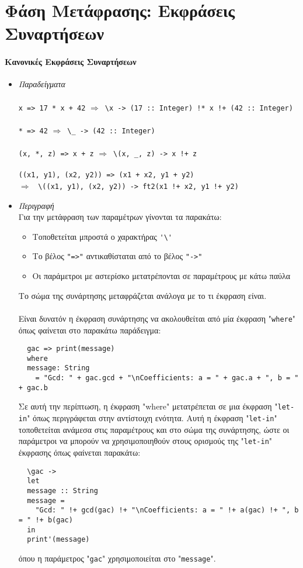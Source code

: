 \documentclass[diploma]{softlab-thesis}
\def\lra{$\Longrightarrow$\ }
\begin{document}
\newpage

\section{Φάση Μετάφρασης: Εκφράσεις Συναρτήσεων}

\paragraph{Κανονικές Εκφράσεις Συναρτήσεων}

\begin{itemize}
\item
\textit{Παραδείγματα}\\\\
\verb|x => 17 * x + 42| \lra \verb|\x -> (17 :: Integer) !* x !+ (42 :: Integer)|
\\\\
\verb|* => 42| \lra \verb|\_ -> (42 :: Integer)|
\\\\
\verb|(x, *, z) => x + z| \lra \verb|\(x, _, z) -> x !+ z|
\\\\
\verb|((x1, y1), (x2, y2)) => (x1 + x2, y1 + y2)|\\
\lra
\verb|\((x1, y1), (x2, y2)) -> ft2(x1 !+ x2, y1 !+ y2)|\\

\item
\textit{Περιγραφή}\\

Για την μετάφραση των παραμέτρων γίνονται τα παρακάτω:
\begin{itemize}
\item
Τοποθετείται μπροστά ο χαρακτήρας \verb|'\'|
\item
Το βέλος \verb|"=>"| αντικαθίσταται από το βέλος \verb|"->"|
\item
Οι παράμετροι με αστερίσκο μετατρέπονται σε παραμέτρους με κάτω παύλα
\end{itemize}
Το σώμα της συνάρτησης μεταφράζεται ανάλογα με το τι έκφραση είναι.
\\\\
Είναι δυνατόν η έκφραση συνάρτησης να ακολουθείται από μία έκφραση
"\texttt{where}" όπως φαίνεται στο παρακάτω παράδειγμα:
\begin{verbatim}
  gac => print(message)
  where
  message: String
    = "Gcd: " + gac.gcd + "\nCoefficients: a = " + gac.a + ", b = " + gac.b
\end{verbatim}
Σε αυτή την περίπτωση, η έκφραση "where" μετατρέπεται σε μια έκφραση
"\texttt{let-in}" όπως περιγράφεται στην αντίστοιχη ενότητα. Αυτή η έκφραση
"\texttt{let-in}" τοποθετείται ανάμεσα στις παραμέτρους και στο σώμα της
συνάρτησης, ώστε οι παράμετροι να μπορούν να χρησιμοποιηθούν στους ορισμούς
της "\texttt{let-in}" έκφρασης όπως φαίνεται παρακάτω:
\begin{verbatim}
  \gac ->
  let
  message :: String
  message =
    "Gcd: " !+ gcd(gac) !+ "\nCoefficients: a = " !+ a(gac) !+ ", b = " !+ b(gac)
  in
  print'(message)
\end{verbatim}
όπου η παράμετρος "\verb|gac|" χρησιμοποιείται στο "\verb|message|".

\end{itemize}
\end{document}
